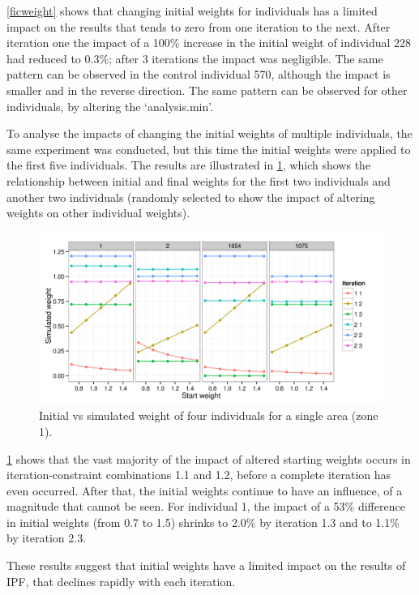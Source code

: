 \documentclass[a4paper,10pt]{article}
\begin{document}
\cref{ficweight} shows that changing initial weights 
for individuals has a limited impact on the results that
 tends to zero from one iteration to the next. 
After iteration one the impact of a 100\% increase in the initial weight 
of individual 228 had reduced to 0.3\%; after 3 iterations the impact was negligible. 
The same pattern can be observed in the control individual 570, 
although the impact is smaller and in the reverse direction. 
The same pattern can be observed for other individuals, by altering the `analysis.min'.

To analyse the impacts of changing the initial weights of multiple 
individuals, the same experiment was conducted, but this time the initial weights were
applied to the first five individuals. The results are illustrated in \cref{finweight},
which shows the relationship between initial and final weights for the first two individuals
and another two individuals 
(randomly selected to show the impact of altering weights on other individual weights). 

\begin{figure}
 \begin{center}
  \includegraphics[width=12cm]{weights-exp-54nice2}
 \end{center}
\caption{Initial vs simulated weight of four individuals for a single area (zone 1).}
\label{finweight}
\end{figure}

\cref{finweight} shows that the vast majority of the impact of altered starting weights occurs in iteration-constraint
combinations 1.1 and 1.2, before a complete iteration has even occurred. 
After that, the initial weights continue to have an influence, of a magnitude that cannot be 
seen. For individual 1, the impact of a 53\% difference in initial weights (from 0.7 to 1.5) shrinks to 
2.0\% by iteration 1.3 and to 1.1\% by iteration 2.3. 

These results suggest that initial weights have a limited impact on the results of IPF, that declines rapidly with each iteration. 
\end{document}

